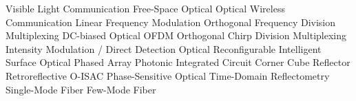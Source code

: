 {}\markdownRendererPipe{}  \markdownRendererPipe{} Visible Light Communication \markdownRendererPipe{}\markdownRendererSoftLineBreak
{}\markdownRendererPipe{}  \markdownRendererPipe{} Free-Space Optical \markdownRendererPipe{}\markdownRendererSoftLineBreak
{}\markdownRendererPipe{}  \markdownRendererPipe{} Optical Wireless Communication \markdownRendererPipe{}\markdownRendererSoftLineBreak
{}\markdownRendererPipe{}  \markdownRendererPipe{} Linear Frequency Modulation \markdownRendererPipe{}\markdownRendererSoftLineBreak
{}\markdownRendererPipe{}  \markdownRendererPipe{} Orthogonal Frequency Division Multiplexing \markdownRendererPipe{}\markdownRendererSoftLineBreak
{}\markdownRendererPipe{}  \markdownRendererPipe{} DC-biased Optical OFDM \markdownRendererPipe{}\markdownRendererSoftLineBreak
{}\markdownRendererPipe{}  \markdownRendererPipe{} Orthogonal Chirp Division Multiplexing \markdownRendererPipe{}\markdownRendererSoftLineBreak
{}\markdownRendererPipe{}  \markdownRendererPipe{} Intensity Modulation / Direct Detection \markdownRendererPipe{}\markdownRendererSoftLineBreak
{}\markdownRendererPipe{}  \markdownRendererPipe{} Optical Reconfigurable Intelligent Surface \markdownRendererPipe{}\markdownRendererSoftLineBreak
{}\markdownRendererPipe{}  \markdownRendererPipe{} Optical Phased Array \markdownRendererPipe{}\markdownRendererSoftLineBreak
{}\markdownRendererPipe{}  \markdownRendererPipe{} Photonic Integrated Circuit \markdownRendererPipe{}\markdownRendererSoftLineBreak
{}\markdownRendererPipe{}  \markdownRendererPipe{} Corner Cube Reflector \markdownRendererPipe{}\markdownRendererSoftLineBreak
{}\markdownRendererPipe{}  \markdownRendererPipe{} Retroreflective O-ISAC \markdownRendererPipe{}\markdownRendererSoftLineBreak
{}\markdownRendererPipe{}  \markdownRendererPipe{} Phase-Sensitive Optical Time-Domain Reflectometry \markdownRendererPipe{}\markdownRendererSoftLineBreak
{}\markdownRendererPipe{}  \markdownRendererPipe{} Single-Mode Fiber \markdownRendererPipe{}\markdownRendererSoftLineBreak
{}\markdownRendererPipe{}  \markdownRendererPipe{} Few-Mode Fiber \markdownRendererPipe{}\markdownRendererSoftLineBreak
